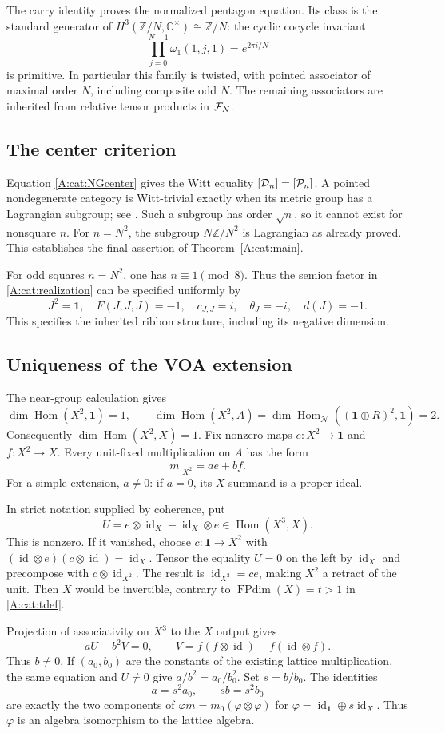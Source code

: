 \documentclass[11pt]{article}
\newcommand{\C}{\mathbb C}\newcommand{\Q}{\mathbb Q}\newcommand{\Z}{\mathbb Z}
\newcommand{\one}{\mathbf1}\newcommand{\D}{\mathcal D}\newcommand{\Dcat}{\mathcal D}
\newcommand{\FP}{\operatorname{FPdim}}\newcommand{\Irr}{\operatorname{Irr}}
\newcommand{\Hom}{\operatorname{Hom}}\newcommand{\id}{\operatorname{id}}
\newcommand{\N}{\mathcal N}\newcommand{\F}{\mathcal F}
\numberwithin{equation}{section}
\begin{document}
The carry identity proves the normalized pentagon equation. Its class is the standard generator of $H^3(\Z/N,\C^\times)\cong\Z/N$: the cyclic cocycle invariant
\[
 \prod_{j=0}^{N-1}\omega_1(1,j,1)=e^{2\pi i/N}
\]
is primitive. In particular this family is twisted, with pointed associator of maximal order $N$, including composite odd $N$. The remaining associators are inherited from relative tensor products in $\mathcal F_N$.

\subsection{The center criterion}\label{A:cat:centercriterion}
Equation \eqref{A:cat:NGcenter} gives the Witt equality $[\D_n]=[\Pcat_n]$. A pointed nondegenerate category is Witt-trivial exactly when its metric group has a Lagrangian subgroup; see \cite[Section 5.3]{A:DMNO}. Such a subgroup has order $\sqrt n$, so it cannot exist for nonsquare $n$. For $n=N^2$, the subgroup $N\Z/N^2$ is Lagrangian as already proved. This establishes the final assertion of Theorem~\ref{A:cat:main}.

For odd squares $n=N^2$, one has $n\equiv1\pmod8$. Thus the semion factor in \eqref{A:cat:realization} can be specified uniformly by
\[
 J^2=\one,\quad F(J,J,J)=-1,\quad c_{J,J}=i,\quad
 \theta_J=-i,\quad d(J)=-1.
\]
This specifies the inherited ribbon structure, including its negative dimension.


\subsection{Uniqueness of the VOA extension}\label{sec:extension}
The near-group calculation gives
\[
 \dim\Hom(X^2,\one)=1,\qquad
 \dim\Hom(X^2,A)=\dim\Hom_{\N}((\one\oplus R)^2,\one)=2.
\]
Consequently $\dim\Hom(X^2,X)=1$. Fix nonzero maps $e:X^2\to\one$ and $f:X^2\to X$. Every unit-fixed multiplication on $A$ has the form
\[
 m|_{X^2}=a e+b f.
\]
For a simple extension, $a\ne0$: if $a=0$, its $X$ summand is a proper ideal. 

In strict notation supplied by coherence, put
\[
 U=e\otimes\id_X-\id_X\otimes e\in\Hom(X^3,X).
\]
This is nonzero. If it vanished, choose $c:\one\to X^2$ with $(\id\otimes e)(c\otimes\id)=\id_X$. Tensor the equality $U=0$ on the left by $\id_X$ and precompose with $c\otimes\id_{X^2}$. The result is $\id_{X^2}=ce$, making $X^2$ a retract of the unit. Then $X$ would be invertible, contrary to $\FP(X)=t>1$ in \eqref{A:cat:tdef}.

Projection of associativity on $X^3$ to the $X$ output gives
\[
 aU+b^2V=0,\qquad
 V=f(f\otimes\id)-f(\id\otimes f).
\]
Thus $b\ne0$. If $(a_0,b_0)$ are the constants of the existing lattice multiplication, the same equation and $U\ne0$ give $a/b^2=a_0/b_0^2$. Set $s=b/b_0$. The identities
\[
 a=s^2a_0,\qquad sb=s^2b_0
\]
are exactly the two components of $\varphi m=m_0(\varphi\otimes\varphi)$ for $\varphi=\id_{\one}\oplus s\id_X$. Thus $\varphi$ is an algebra isomorphism to the lattice algebra.
\end{document}
